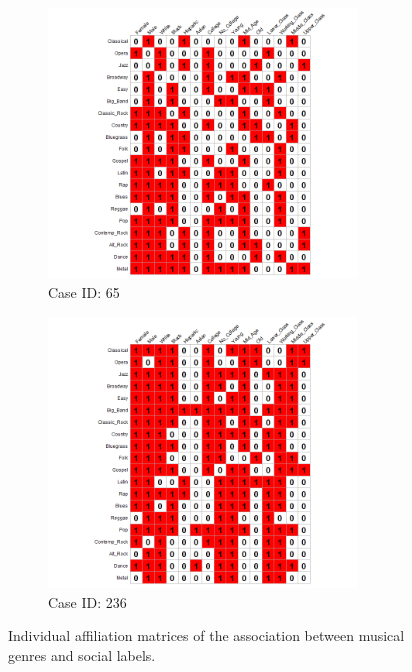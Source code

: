 \documentclass[12pt]{article}
\begin{document}
\begin{figure}[t]
    \captionsetup[subfigure]{font=footnotesize,labelfont=footnotesize}
    \centering
     \begin{subfigure}[b]{0.49\textwidth}
        \includegraphics[trim={4cm 0cm 3cm 0cm},clip, width=0.9\textwidth]{Plots/data-ex-af1.png}
            \caption{Case ID: 65}
            \label{fig:ind-ex-aff1}
    \end{subfigure}
     \begin{subfigure}[b]{0.49\textwidth}
        \includegraphics[trim={4cm 0cm 3cm 0cm},clip, width=0.9\textwidth]{Plots/data-ex-af2.png}
            \caption{Case ID: 236}
            \label{fig:ind-ex-aff2}
    \end{subfigure}
    \caption{Individual affiliation matrices of the association between musical genres and social labels.}
    \label{fig:ind-ex-aff}
\end{figure}
\end{document}
